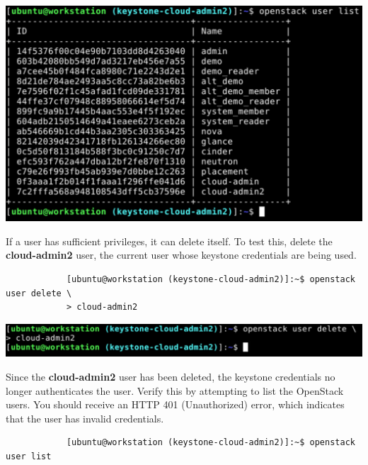 \documentclass[letterpaper, 12pt]{article}
\begin{document}
\begin{enumerate}
\begin{labstep}
        \begin{center}
            \includegraphics[width=\linewidth]{images/appendix/step7.png}
        \end{center}
    \end{labstep}

    \begin{labstep}
        If a user has sufficient privileges, it can delete itself.
        To test this, delete the \textbf{cloud-admin2} user, the current user whose keystone credentials are being used.
        \begin{lstlisting}
            [ubuntu@workstation (keystone-cloud-admin2)]:~$ openstack user delete \
            > cloud-admin2
        \end{lstlisting}

        \begin{center}
            \includegraphics[width=\linewidth]{images/appendix/step8.png}
        \end{center}
    \end{labstep}

    \begin{labstep}
        Since the \textbf{cloud-admin2} user has been deleted, the keystone credentials no longer authenticates the user.
        Verify this by attempting to list the OpenStack users.
        You should receive an HTTP 401 (Unauthorized) error, which indicates that the user has invalid credentials.
        \begin{lstlisting}
            [ubuntu@workstation (keystone-cloud-admin2)]:~$ openstack user list
        \end{lstlisting}


\end{labstep}
\end{enumerate}
\end{document}
